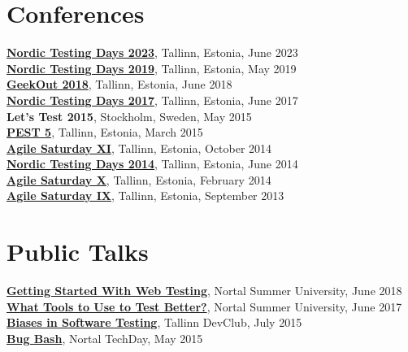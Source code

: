 \documentclass[a4paper, 12pt]{article}
\begin{document}
\section{Conferences}

\textbf{\href{https://nordictestingdays.eu/}{Nordic Testing Days 2023}}, Tallinn, Estonia, June 2023\\
\textbf{\href{https://nordictestingdays.eu/2019-2/}{Nordic Testing Days 2019}}, Tallinn, Estonia, May 2019\\
\textbf{\href{https://2018.geekout.ee/}{GeekOut 2018}}, Tallinn, Estonia, June 2018\\
\textbf{\href{https://nordictestingdays.eu/2017-2/}{Nordic Testing Days 2017}}, Tallinn, Estonia, June 2017\\
\textbf{Let's Test 2015}, Stockholm, Sweden, May 2015\\
\textbf{\href{https://kristjanuba.wordpress.com/2014/09/27/pest5-testing-craft-social-or-technical/}{PEST 5}}, Tallinn, Estonia, March 2015\\
\textbf{\href{http://agile.ee/2014/agile-saturday-xi/}{Agile Saturday XI}}, Tallinn, Estonia, October 2014\\
\textbf{\href{https://nordictestingdays.eu/2014-2/}{Nordic Testing Days 2014}}, Tallinn, Estonia, June 2014\\
\textbf{\href{http://agile.ee/2014/agile-saturday-x/}{Agile Saturday X}}, Tallinn, Estonia, February 2014\\
\textbf{\href{http://agile.ee/agile-saturday/agile-saturday-ix/}{Agile Saturday IX}}, Tallinn, Estonia, September 2013

\section{Public Talks}

\textbf{\href{https://ivanova-irina.blogspot.com/2018/07/nortal-summer-university-workshop.html}{Getting Started With Web Testing}}, Nortal Summer University, June 2018\\
\textbf{\href{https://ivanova-irina.blogspot.com/2017/06/nortal-summer-university-workshop-about.html}{What Tools to Use to Test Better?}}, Nortal Summer University, June 2017\\
\textbf{\href{https://ivanova-irina.blogspot.com/2015/07/presentation-in-devclub-about-biases-in.html}{Biases in Software Testing}}, Tallinn DevClub, July 2015\\
\textbf{\href{https://ivanova-irina.blogspot.com/2015/06/my-first-ever-workshop-at-nortal.html}{Bug Bash}}, Nortal TechDay, May 2015
\end{document}
